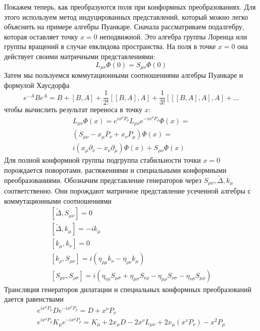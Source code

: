 \documentclass[a4paper,12pt]{article}
\theoremstyle{definition}
\theoremstyle{definition}
\theoremstyle{definition}
\begin{document}
Покажем теперь, как преобразуются поля при конформных преобразованиях. Для этого используем метод
индуцированных представлений, который можно легко объяснить на примере алгебры Пуанкаре. Сначала
рассматриваем подалгебру, которая оставляет точку $x=0$ неподвижной. Это алгебра группы Лоренца или
группы вращений в случае евклидова пространства. На поля в точке $x=0$ она действует своими
матричными представлениями: 
\begin{equation}
  \label{eq:176}
  L_{\mu\nu}\Phi(0)=S_{\mu\nu}\Phi(0)
\end{equation}
Затем мы пользуемся коммутационными соотношениями алгебры Пуанкаре и формулой Хаусдорфа
\begin{equation}
  \label{eq:177}
  e^{-A}B e^{A}=B+[B,A]+\frac{1}{2!}[[B,A],A]+\frac{1}{3!}[[[B,A],A],A]+\dots
\end{equation}
чтобы вычислить результат переноса в точку $x$:
\begin{multline}
  \label{eq:178}
  L_{\mu\nu}\Phi(x)=e^{ix^{\rho}P_{\rho}}L_{\mu\nu}e^{-i x^{\rho}P_{\rho}}\Phi(x)=\\
  (S_{\mu\nu}-x_{\mu}P_{\nu}+x_{\nu}P_{\mu})\Phi(x)=\\
  i(x_{\mu}\partial_{\nu}-x_{\nu}\partial_{\mu})\Phi(x)+S_{\mu\nu}\Phi(x)
\end{multline}
Для полной конформной группы подгруппа стабильности точки $x=0$ порождается поворотами, растяжениями
и специальными конформными преобразованиями. Обозначим представление генераторов через $S_{\mu\nu},
\tilde \Delta, k_{\mu}$ соответственно. Они порождают матричное представление усеченной алгебры с
коммутационными соотношениями 
\begin{eqnarray}
  \label{eq:179}
  \left[\tilde\Delta,S_{\mu\nu}\right]=0\\
  \left[\tilde \Delta,k_{\mu}\right]=-i k_{\mu}\\
  \left[k_{\mu},k_{\nu}\right]=0\\
  \left[k_{\rho},S_{\mu\nu}\right]=i(\eta_{\rho\mu}k_{\nu}-\eta_{\rho\nu}k_{\mu})\\
  \left[S_{\mu\nu},S_{\rho\sigma}\right]=i(\eta_{\nu\rho}S_{\mu\sigma}+\eta_{\mu\sigma}S_{\nu\rho}-\eta_{\mu\rho}S_{\nu\sigma}-\eta_{\nu\sigma}S_{\mu\rho})
\end{eqnarray}
Трансляция генераторов дилатации и специальных конформных преобразований дается равенствами
\begin{eqnarray}
  \label{eq:180}
  e^{i x^{\rho}P_{\rho}}D e^{-i x^{\rho}P_{\rho}}=D+x^{\nu}P_{\nu}\\
  e^{i x^{\rho}P_{\rho}}K_{\mu} e^{-i x^{\rho}P_{\rho}}=K_{\mu}+2x_{\mu}D -2 x^{\nu}L_{\mu\nu}+2x_{\mu}(x^{\nu}P_{\nu})-x^{2} P_{\mu}
\end{eqnarray}
\end{document}
